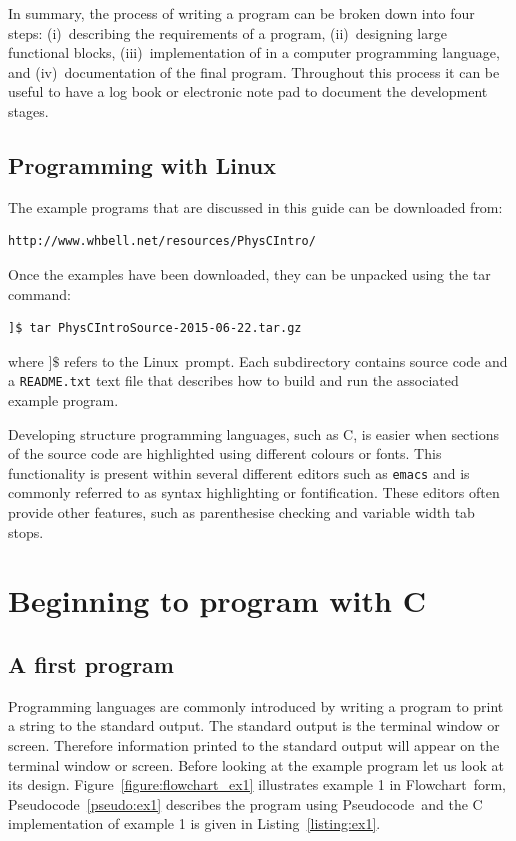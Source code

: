 \documentclass[11pt]{scrartcl}
\def\psc{Pseudocode}
\def\flo{Flowchart}
\def\linux{Linux}
\begin{document}
In summary, the process of writing a program can be broken down into four steps: (i)~describing the requirements of a program, (ii)~designing large functional blocks, (iii)~implementation of in a computer programming language, and (iv)~documentation of the final program.  Throughout this process it can be useful to have a log book or electronic note pad to document the development stages.

\subsection{Programming with Linux}
The example programs that are discussed in this guide can be downloaded from:
\begin{verbatim}
http://www.whbell.net/resources/PhysCIntro/
\end{verbatim}
Once the examples have been downloaded, they can be unpacked using the tar command:
\begin{verbatim}
]$ tar PhysCIntroSource-2015-06-22.tar.gz
\end{verbatim} %
where \texttt{$]\$$} refers to the \linux\ prompt.  Each subdirectory contains source code and a \texttt{README.txt} text file that describes how to build and run the associated example program.

Developing structure programming languages, such as C, is easier when sections of the source code are highlighted using different colours or fonts.  This functionality is present within several different editors such as \texttt{emacs} and is commonly referred to as syntax highlighting or fontification.  These editors often provide other features, such as parenthesise checking and variable width tab stops.


\section{Beginning to program with C}

\subsection{A first program}

Programming languages are commonly introduced by writing a program to print a string to the standard output.
The standard output is the terminal window or screen.  Therefore information printed to the
standard output will appear on the terminal window or screen.  Before
looking at the example program let us look at its design.
Figure~\ref{figure:flowchart_ex1} illustrates example 1 in \flo\
form, \psc~\ref{pseudo:ex1} describes the program using
\psc\ and the C implementation of example 1 is given in
Listing~\ref{listing:ex1}.
\end{document}
